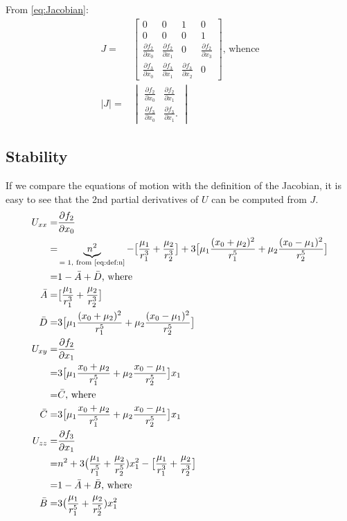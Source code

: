 \documentclass[]{article}
\begin{document}
From \ref{eq:Jacobian}:
\begin{align*}
		J =& \begin{bmatrix}
		0&0&1&0\\
		0&0&0&1\\
		\frac{\partial f_2}{\partial x_0}&\frac{\partial f_2}{\partial x_1}&0&\frac{\partial f_2}{\partial x_3}\\
		\frac{\partial f_3}{\partial x_0}&\frac{\partial f_3}{\partial x_1}&\frac{\partial f_3}{\partial x_2}&0
	\end{bmatrix} \text{, whence}\\
	\vert J \vert =& \begin{vmatrix} 
		\frac{\partial f_2}{\partial x_0}&\frac{\partial f_2}{\partial x_1} \\ 
		\frac{\partial f_3}{\partial x_0}&\frac{\partial f_3}{\partial x_1}.
	\end{vmatrix}
\end{align*}

\subsection{Stability}

If we compare the equations of motion with the definition of the Jacobian, it is easy to see that the 2nd partial derivatives of $U$ can be computed from $J$.
\begin{align*}
	U_{xx}=& \frac{\partial f_2}{\partial x_0}\\
	=& \underbrace{n^2}_\text{$=1$, from \eqref{eq:def:n}} -\big[\frac{\mu_1}{r_1^3} + \frac{\mu_2}{r_2^3}\big] + 3\big[\mu_1\frac{(x_0+\mu_2)^2}{r_1^5} + \mu_2\frac{(x_0-\mu_1)^2}{r_2^5}\big]\\
	=& 1-\bar{A} + \bar{D} \text{, where}\\
	\bar{A} =&\big[\frac{\mu_1}{r_1^3} + \frac{\mu_2}{r_2^3}\big]\\
	\bar{D} =& 3\big[\mu_1\frac{(x_0+\mu_2)^2}{r_1^5} + \mu_2\frac{(x_0-\mu_1)^2}{r_2^5}\big]\\
	U_{xy}=& \frac{\partial f_2}{\partial x_1}\\
	=&3 \big[\mu_1\frac{x_0+\mu_2}{r_1^5} + \mu_2\frac{x_0-\mu_1}{r_2^5}\big]x_1\\
	=& \bar{C} \text{, where}\\
	\bar{C}=&3 \big[\mu_1\frac{x_0+\mu_2}{r_1^5} + \mu_2\frac{x_0-\mu_1}{r_2^5}\big]x_1\\
	U_{zz}=&\frac{\partial f_3}{\partial x_1}\\
	=& n^2  + 3 \big(\frac{\mu_1}{r_1^5} + \frac{\mu_2}{r_2^5})x_1^2 - \big[\frac{\mu_1}{r_1^3} + \frac{\mu_2}{r_2^3}\big] \\
	=& 1-\bar{A}+\bar{B} \text{, where}\\
	\bar{B} =& 3 \big(\frac{\mu_1}{r_1^5} + \frac{\mu_2}{r_2^5})x_1^2 
\end{align*}
\end{document}
